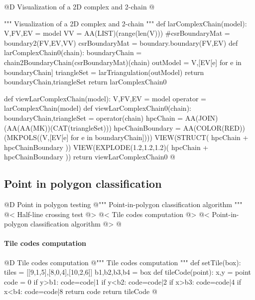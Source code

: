 \documentclass[11pt,oneside]{article}    %
\begin{document}
@D Visualization of a 2D complex and 2-chain
@{""" Visualization of a 2D complex and 2-chain """
def larComplexChain(model):
    V,FV,EV = model
    VV = AA(LIST)(range(len(V)))
    #csrBoundaryMat = boundary2(FV,EV,VV)
    csrBoundaryMat = boundary.boundary(FV,EV)
    def larComplexChain0(chain):
        boundaryChain = chain2BoundaryChain(csrBoundaryMat)(chain)
        outModel = V,[EV[e] for e in boundaryChain]
        triangleSet = larTriangulation(outModel)
        return boundaryChain,triangleSet
    return larComplexChain0
    
def viewLarComplexChain(model):
    V,FV,EV = model
    operator = larComplexChain(model)
    def viewLarComplexChain0(chain):
        boundaryChain,triangleSet = operator(chain)
        hpcChain = AA(JOIN)(AA(AA(MK))(CAT(triangleSet)))
        hpcChainBoundary = AA(COLOR(RED))(MKPOLS((V,[EV[e] for e in boundaryChain])))
        VIEW(STRUCT( hpcChain + hpcChainBoundary ))
        VIEW(EXPLODE(1.2,1.2,1.2)( hpcChain + hpcChainBoundary ))
    return viewLarComplexChain0
@}




\subsection{Point in polygon classification}


@D Point in polygon testing
@{""" Point-in-polygon classification algorithm """
@< Half-line crossing test @>
@< Tile codes computation @>
@< Point-in-polygon classification algorithm @>
@}

\paragraph{Tile codes computation}
@D Tile codes computation
@{""" Tile codes computation """
def setTile(box):
    tiles = [[9,1,5],[8,0,4],[10,2,6]]
    b1,b2,b3,b4 = box
    def tileCode(point):
        x,y = point
        code = 0
        if y>b1: code=code|1
        if y<b2: code=code|2
        if x>b3: code=code|4
        if x<b4: code=code|8
        return code 
    return tileCode
@}
\end{document}
